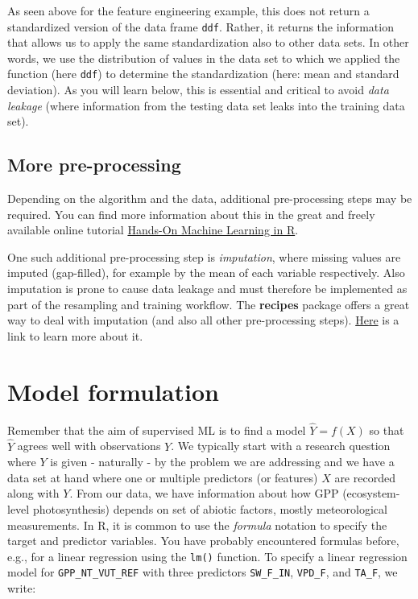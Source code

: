 \documentclass[
]{book}
\begin{document}
As seen above for the feature engineering example, this does not return a standardized version of the data frame \texttt{ddf}. Rather, it returns the information that allows us to apply the same standardization also to other data sets. In other words, we use the distribution of values in the data set to which we applied the function (here \texttt{ddf}) to determine the standardization (here: mean and standard deviation). As you will learn below, this is essential and critical to avoid \emph{data leakage} (where information from the testing data set leaks into the training data set).

\hypertarget{more-pre-processing}{%
\section{More pre-processing}\label{more-pre-processing}}

Depending on the algorithm and the data, additional pre-processing steps may be required. You can find more information about this in the great and freely available online tutorial \href{https://bradleyboehmke.github.io/HOML/engineering.html\#target-engineering}{Hands-On Machine Learning in R}.

One such additional pre-processing step is \emph{imputation}, where missing values are imputed (gap-filled), for example by the mean of each variable respectively. Also imputation is prone to cause data leakage and must therefore be implemented as part of the resampling and training workflow. The \textbf{recipes} package offers a great way to deal with imputation (and also all other pre-processing steps). \href{https://bradleyboehmke.github.io/HOML/engineering.html\#impute}{Here} is a link to learn more about it.

\hypertarget{model-formulation}{%
\chapter{Model formulation}\label{model-formulation}}

Remember that the aim of supervised ML is to find a model \(\hat{Y} = f(X)\) so that \(\hat{Y}\) agrees well with observations \(Y\). We typically start with a research question where \(Y\) is given - naturally - by the problem we are addressing and we have a data set at hand where one or multiple predictors (or features) \(X\) are recorded along with \(Y\). From our data, we have information about how GPP (ecosystem-level photosynthesis) depends on set of abiotic factors, mostly meteorological measurements. In R, it is common to use the \emph{formula} notation to specify the target and predictor variables. You have probably encountered formulas before, e.g., for a linear regression using the \texttt{lm()} function. To specify a linear regression model for \texttt{GPP\_NT\_VUT\_REF} with three predictors \texttt{SW\_F\_IN}, \texttt{VPD\_F}, and \texttt{TA\_F}, we write:
\end{document}
